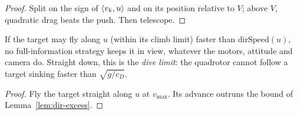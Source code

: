 \begin{proof}
\leanok
Split on the sign of $\langle v_k, u \rangle$ and on its position relative to $V$; above
$V$, quadratic drag beats the push. Then telescope.
\end{proof}

\begin{theorem}
\label{thm:speed}
\leanok
{}
If the target may fly along $u$ (within its climb limit) faster than
$\mathrm{dirSpeed}(u)$, no full-information strategy keeps it in view, whatever the
motors, attitude and camera do. Straight down, this is the \emph{dive limit}: the
quadrotor cannot follow a target sinking faster than $\sqrt{g/c_D}$.
\end{theorem}

\begin{proof}
\leanok
Fly the target straight along $u$ at $v_{\max}$. Its advance outruns the bound of
Lemma~\ref{lem:dir-excess}.
\end{proof}
